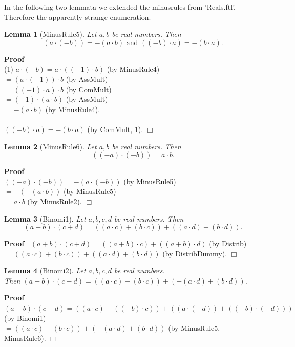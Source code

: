\documentclass{article}
\newenvironment{forthel}{\begin{leftbar}}{\end{leftbar}}
\newenvironment{proof}{\noindent\textbf{Proof\ }}{\hspace*{\fill}$\Box$\medskip}
\newtheorem{lemma}{Lemma}
\newcommand{\dotequal}{=}
\begin{document}
\noindent In the following two lemmata we extended the minusrules from 'Reals.ftl'. Therefore the apparently strange enumeration.

\begin{forthel}
		
	\begin{lemma}[MinusRule5]
	Let $a,b$ be real numbers. 
	Then $$(a \cdot (-b)) = -(a \cdot b) \text{ and } ((-b) \cdot a) = -(b \cdot a).$$
	\end{lemma}
	\begin{proof} \\
	(1) $a \cdot (-b) \dotequal a \cdot ((-1) \cdot b)$ (by MinusRule4)
	\\$\dotequal (a \cdot (-1)) \cdot b$ (by AssMult)
	\\$\dotequal ((-1) \cdot a) \cdot b$ (by ComMult)
	\\$\dotequal (-1) \cdot (a \cdot b)$ (by AssMult)
	\\$\dotequal -(a \cdot b)$ (by MinusRule4).
	\\\\$((-b) \cdot a) \dotequal -(b \cdot a)$ (by ComMult, 1).
	\end{proof}
	
	\begin{lemma}[MinusRule6]
	Let $a,b$ be real numbers. 
	Then $$((-a) \cdot (-b)) = a \cdot b.$$
	\end{lemma}
	\begin{proof}\\
	$((-a) \cdot (-b)) \dotequal -(a \cdot (-b))$ (by MinusRule5)
	\\$\dotequal -(-(a \cdot b))$ (by MinusRule5)
	\\$\dotequal a \cdot b$ (by MinusRule2).
	\end{proof}
	
	\begin{lemma}[Binomi1]
	Let $a,b,c,d$ be real numbers.
	Then $$(a + b) \cdot (c + d) = ((a \cdot c) + (b \cdot c)) + ((a \cdot d) + (b \cdot d)).$$
	\end{lemma}
	\begin{proof}
	$(a + b) \cdot (c + d) \dotequal ((a + b) \cdot c) + ((a + b) \cdot d)$ (by Distrib)
	\\$\dotequal ((a \cdot c) + (b \cdot c)) + ((a \cdot d) + (b \cdot d))$ (by DistribDummy).
	\end{proof}
	
	\begin{lemma}[Binomi2]
	Let $a,b,c,d$ be real numbers.
	\\Then $(a - b) \cdot (c - d) = ((a \cdot c) - (b \cdot c)) + (-(a \cdot d) + (b \cdot d))$.
	\end{lemma}
	\begin{proof}
	$(a - b) \cdot (c - d) \dotequal ((a \cdot c) + ((-b) \cdot c)) + ((a \cdot (-d)) + ((-b) \cdot (-d)))$ (by Binomi1)
	\\$\dotequal ((a \cdot c) - (b \cdot c)) + (-(a \cdot d) + (b \cdot d))$ (by MinusRule5, MinusRule6).
	\end{proof}

	
\end{forthel}
\end{document}
